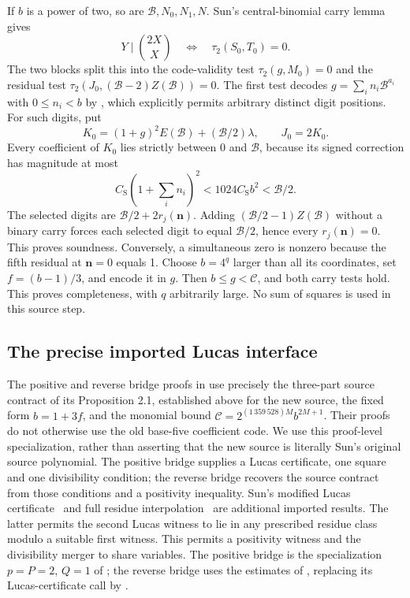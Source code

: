 If $b$ is a power of two, so are $\mathcal B,N_0,N_1,N$.
Sun's central-binomial carry lemma~\cite[Lemma 2.2]{sun2021} gives
\[
 Y\mid\binom{2X}{X}
 \quad\Longleftrightarrow\quad
 \tau_2(S_0,T_0)=0.
\]
The two blocks split this into the code-validity test
$\tau_2(g,M_0)=0$ and the residual test
$\tau_2(J_0,(\mathcal B-2)Z(\mathcal B))=0$.
The first test decodes
$g=\sum_i n_i\mathcal B^{a_i}$ with $0\le n_i<b$ by
\cite[Lemma 2.4]{sun2021}, which explicitly permits arbitrary distinct
digit positions. For such digits, put
\[
 K_0=(1+g)^2E(\mathcal B)+(\mathcal B/2)\lambda,
 \qquad J_0=2K_0.
\]
Every coefficient of $K_0$ lies strictly between 0 and $\mathcal B$,
because its signed correction has magnitude at most
\[
 C_{\mathrm S}\left(1+\sum_i n_i\right)^2
 <1024C_{\mathrm S}b^2<\mathcal B/2.
\]
The selected digits are $\mathcal B/2+2r_j(\mathbf n)$.
Adding $(\mathcal B/2-1)Z(\mathcal B)$ without a binary carry
forces each selected digit to equal $\mathcal B/2$, hence every
$r_j(\mathbf n)=0$. This proves soundness.
Conversely, a simultaneous zero is nonzero because the fifth residual
at $\mathbf n=0$ equals 1. Choose $b=4^q$ larger than all its coordinates,
set $f=(b-1)/3$, and encode it in $g$. Then $b\le g<\mathscr C$,
and both carry tests hold. This proves completeness, with $q$ arbitrarily
large. No sum of squares is used in this source step.

\subsection{The precise imported Lucas interface}

The positive and reverse bridge proofs in
\cite[Propositions 6.1 and 6.2]{sun2026} use precisely the three-part
source contract of its Proposition 2.1, established above for the new
source, the fixed form $b=1+3f$, and the monomial bound
$\mathscr C=2^{(1\,359\,528)M}b^{2M+1}$.
Their proofs do not otherwise use the old base-five coefficient code.
We use this proof-level specialization, rather than asserting that the
new source is literally Sun's original source polynomial.
The positive bridge supplies a Lucas certificate, one square and one
divisibility condition; the reverse bridge recovers the source contract
from those conditions and a positivity inequality.
Sun's modified Lucas certificate~\cite[Theorem 3.1]{sun2026}
and full residue interpolation~\cite[Theorem 4.1]{sun2026} are additional
imported results. The latter permits the second Lucas witness to lie
in any prescribed residue class modulo a suitable first witness.
This permits a positivity witness and the divisibility
merger to share variables. The positive bridge is the specialization
$p=P=2$, $Q=1$ of \cite[Theorem 4.12]{sun2021}; the reverse bridge
uses the estimates of \cite[Theorem 4.13]{sun2021}, replacing its
Lucas-certificate call by \cite[Theorem 3.1]{sun2026}.

